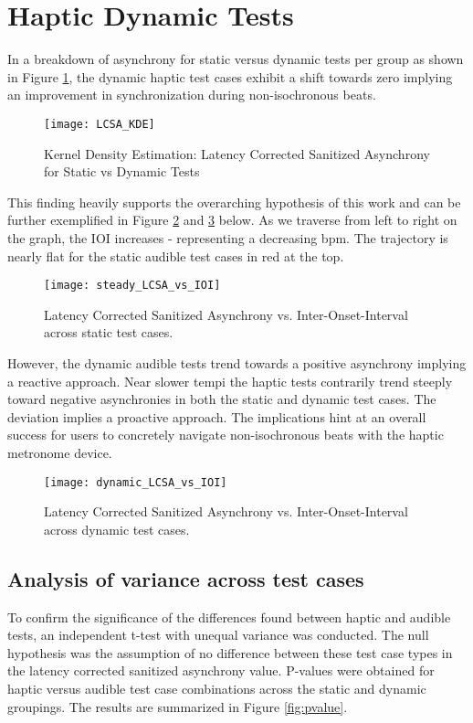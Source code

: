 \section{Haptic Dynamic Tests}
In a breakdown of asynchrony for static versus dynamic tests per group as shown in Figure \ref{fig:LCSA_KDE}, the dynamic haptic test cases exhibit a shift towards zero implying an improvement in synchronization during non-isochronous beats. 
\begin{figure}[H]
    \centering
    \texttt{[image: LCSA\_KDE]}
    \caption{Kernel Density Estimation: Latency Corrected Sanitized Asynchrony for Static vs Dynamic Tests}
    \label{fig:LCSA_KDE}
\end{figure}
This finding heavily supports the overarching hypothesis of this work and can be further exemplified in Figure \ref{fig:sLCSAvIOI} and \ref{fig:dLCSAvIOI} below. As we traverse from left to right on the graph, the IOI increases - representing a decreasing bpm. The trajectory is nearly flat for the static audible test cases in red at the top. 
\begin{figure}[H]
    \centering
    \texttt{[image: steady\_LCSA\_vs\_IOI]}
    \caption{Latency Corrected Sanitized Asynchrony vs. Inter-Onset-Interval across static test cases.}
    \label{fig:sLCSAvIOI}
\end{figure}
However, the dynamic audible tests trend towards a positive asynchrony implying a reactive approach. Near slower tempi the haptic tests contrarily trend steeply toward negative asynchronies in both the static and dynamic test cases. The deviation implies a proactive approach. The implications hint at an overall success for users to concretely navigate non-isochronous beats with the haptic metronome device. 
\begin{figure}[H]
    \centering
    \texttt{[image: dynamic\_LCSA\_vs\_IOI]}
    \caption{Latency Corrected Sanitized Asynchrony vs. Inter-Onset-Interval across dynamic test cases.}
    \label{fig:dLCSAvIOI}
\end{figure}

\subsection{Analysis of variance across test cases}

To confirm the significance of the differences found between haptic and audible tests, an independent t-test with unequal variance was conducted. The null hypothesis was the assumption of no difference between these test case types in the latency corrected sanitized asynchrony value. P-values were obtained for haptic versus audible test case combinations across the static and dynamic groupings. The results are summarized in Figure \ref{fig:pvalue}.

